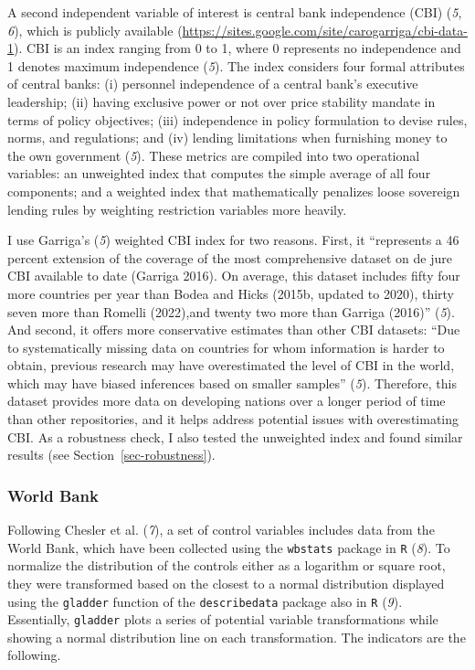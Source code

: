 \documentclass[
  12pt,
  letterpaper,
]{article}
\begin{document}
A second independent variable of interest is central bank independence
(CBI) (\emph{5}, \emph{6}), which is publicly available
(\url{https://sites.google.com/site/carogarriga/cbi-data-1}). CBI is an
index ranging from 0 to 1, where 0 represents no independence and 1
denotes maximum independence (\emph{5}). The index considers four formal
attributes of central banks: (i) personnel independence of a central
bank's executive leadership; (ii) having exclusive power or not over
price stability mandate in terms of policy objectives; (iii)
independence in policy formulation to devise rules, norms, and
regulations; and (iv) lending limitations when furnishing money to the
own government (\emph{5}). These metrics are compiled into two
operational variables: an unweighted index that computes the simple
average of all four components; and a weighted index that mathematically
penalizes loose sovereign lending rules by weighting restriction
variables more heavily.

I use Garriga's (\emph{5}) weighted CBI index for two reasons. First, it
``represents a 46 percent extension of the coverage of the most
comprehensive dataset on de jure CBI available to date (Garriga 2016).
On average, this dataset includes fifty four more countries per year
than Bodea and Hicks (2015b, updated to 2020), thirty seven more than
Romelli (2022),and twenty two more than Garriga (2016)'' (\emph{5}). And
second, it offers more conservative estimates than other CBI datasets:
``Due to systematically missing data on countries for whom information
is harder to obtain, previous research may have overestimated the level
of CBI in the world, which may have biased inferences based on smaller
samples'' (\emph{5}). Therefore, this dataset provides more data on
developing nations over a longer period of time than other repositories,
and it helps address potential issues with overestimating CBI. As a
robustness check, I also tested the unweighted index and found similar
results (see Section~\ref{sec-robustness}).

\subsubsection{World Bank}\label{world-bank}

Following Chesler et al. (\emph{7}), a set of control variables includes
data from the World Bank, which have been collected using the
\texttt{wbstats} package in \texttt{R} (\emph{8}). To normalize the
distribution of the controls either as a logarithm or square root, they
were transformed based on the closest to a normal distribution displayed
using the \texttt{gladder} function of the \texttt{describedata} package
also in \texttt{R} (\emph{9}). Essentially, \texttt{gladder} plots a
series of potential variable transformations while showing a normal
distribution line on each transformation. The indicators are the
following.
\end{document}
